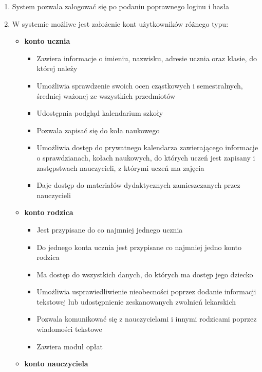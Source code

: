 \documentclass{article}
\begin{document}
\begin{enumerate}
    \item System pozwala zalogować się po podaniu poprawnego loginu i hasła
    \item W systemie możliwe jest założenie kont użytkowników różnego typu:
    \begin{itemize}
        \item \textbf{konto ucznia}
        \begin{itemize}
            \item Zawiera informacje o imieniu, nazwisku, adresie ucznia oraz klasie, do której należy
            \item Umożliwia sprawdzenie swoich ocen cząstkowych i semestralnych, średniej ważonej ze wszystkich przedmiotów
            \item Udostępnia podgląd kalendarium szkoły
            \item Pozwala zapisać się do koła naukowego
            \item Umożliwia dostęp do prywatnego kalendarza zawierającego informacje o sprawdzianach, kołach naukowych, do których uczeń jest zapisany i zastępstwach nauczycieli, z którymi uczeń ma zajęcia
            \item Daje dostęp do materiałów dydaktycznych zamieszczanych przez nauczycieli
        \end{itemize}
        \item \textbf{konto rodzica} 
        \begin{itemize}
            \item Jest przypisane do co najmniej jednego ucznia
            \item Do jednego konta ucznia jest przypisane co najmniej jedno konto rodzica
            \item Ma dostęp do wszystkich danych, do których ma dostęp jego dziecko
            \item Umożliwia usprawiedliwienie nieobecności poprzez dodanie informacji tekstowej lub udostępnienie zeskanowanych zwolnień lekarskich
            \item Pozwala komunikować się z nauczycielami i innymi rodzicami poprzez wiadomości tekstowe
            \item Zawiera moduł opłat %
        \end{itemize}
        \item \textbf{konto nauczyciela} 
        \begin{itemize}

\end{itemize}
\end{itemize}
\end{enumerate}
\end{document}
